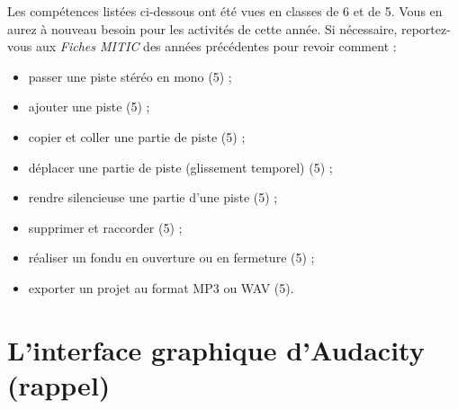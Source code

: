 \vspace{12pt}

Les compétences listées ci-dessous ont été vues en classes de 6 et de 5. Vous en aurez à nouveau besoin pour les activités de cette année. Si nécessaire, reportez-vous aux \emph{Fiches MITIC} des années précédentes pour revoir comment :  

\begin{itemize}
\item passer une piste stéréo en mono (5) ;
\item ajouter une piste (5) ;
\item copier et coller une partie de piste (5) ;
\item déplacer une partie de piste (glissement temporel) (5) ; 
\item rendre silencieuse une partie d'une piste (5) ;
\item supprimer et raccorder (5) ;
\item réaliser un fondu en ouverture ou en fermeture (5) ;
\item exporter un projet au format MP3 ou WAV (5).
\end{itemize}




\section{L'interface graphique d'Audacity (rappel)}


